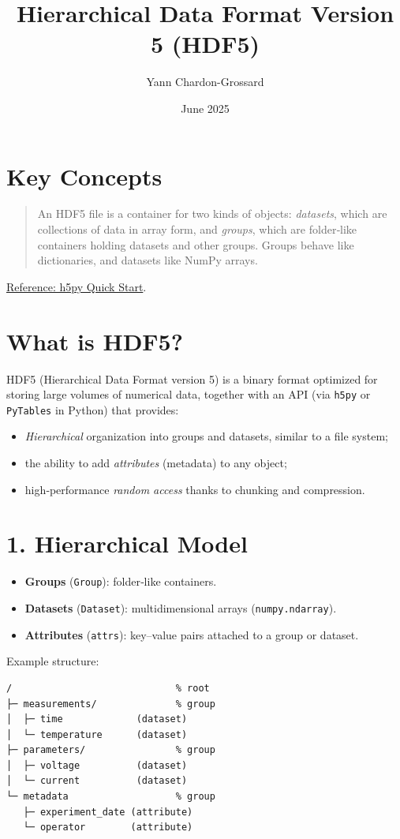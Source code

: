 \documentclass[a4paper,11pt]{article}
\title{Hierarchical Data Format Version 5 (HDF5)}
\author{Yann Chardon-Grossard}
\date{June 2025}
\begin{document}
\maketitle

\section*{Key Concepts}

\begin{quotation}
An HDF5 file is a container for two kinds of objects: \emph{datasets}, which are collections of data in array form, and \emph{groups}, which are folder‐like containers holding datasets and other groups.  Groups behave like dictionaries, and datasets like NumPy arrays.
\end{quotation}
\noindent\href{https://docs.h5py.org/en/stable/quick.html}{Reference: h5py Quick Start}.

\section*{What is HDF5?}
HDF5 (Hierarchical Data Format version 5) is a binary format optimized for storing large volumes of numerical data, together with an API (via \texttt{h5py} or \texttt{PyTables} in Python) that provides:
\begin{itemize}
  \item \emph{Hierarchical} organization into groups and datasets, similar to a file system;
  \item the ability to add \emph{attributes} (metadata) to any object;
  \item high‐performance \emph{random access} thanks to chunking and compression.
\end{itemize}

\section*{1. Hierarchical Model}
\begin{itemize}
  \item \textbf{Groups} (\texttt{Group}): folder‐like containers.
  \item \textbf{Datasets} (\texttt{Dataset}): multidimensional arrays (\texttt{numpy.ndarray}).
  \item \textbf{Attributes} (\texttt{attrs}): key–value pairs attached to a group or dataset.
\end{itemize}

\newpage
\medskip
\noindent Example structure:
\begin{verbatim}
/                             % root
├─ measurements/              % group
│  ├─ time             (dataset)
│  └─ temperature      (dataset)
├─ parameters/                % group
│  ├─ voltage          (dataset)
│  └─ current          (dataset)
└─ metadata                   % group
   ├─ experiment_date (attribute)
   └─ operator        (attribute)
\end{verbatim}
\end{document}
